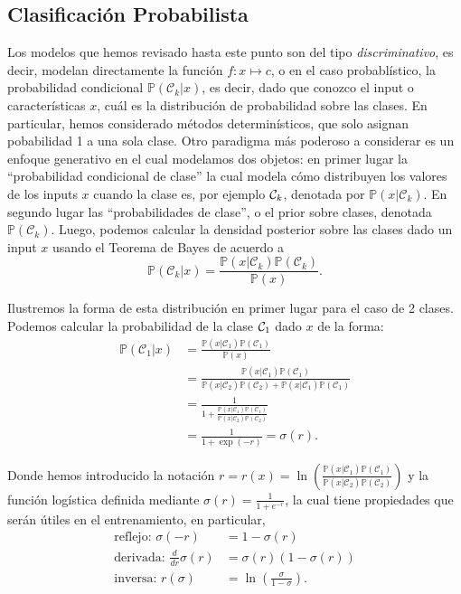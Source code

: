 \subsection{Clasificación Probabilista}

Los modelos que hemos revisado hasta este punto son del tipo \emph{discriminativo}, es decir, modelan directamente la función $f:x\mapsto c$, o  en el caso probablístico, la probabilidad condicional $\mathbb{P}(\mathcal{C}_k|x)$, es decir, dado que conozco el input o características $x$, cuál es la distribución de probabilidad sobre las clases. En particular, hemos considerado métodos determinísticos, que  solo asignan pobabilidad 1 a una sola clase. Otro paradigma más poderoso a considerar es un enfoque generativo en el cual modelamos dos  objetos: en primer lugar la ``probabilidad condicional de clase'' la cual modela cómo distribuyen los valores de los inputs $x$ cuando la  clase es, por  ejemplo ${\mathcal C}_k$, denotada por $\mathbb{P}(x|\mathcal{C}_k)$. En segundo lugar las ``probabilidades de clase'', o el prior sobre clases, denotada $\mathbb{P}(\mathcal{C}_k)$. Luego, podemos calcular la densidad posterior sobre las clases dado un input $x$ usando el Teorema de Bayes de acuerdo a 
\begin{equation}
	\mathbb{P}(\mathcal{C}_k|x) = \frac{\mathbb{P}(x|\mathcal{C}_k)\mathbb{P}(\mathcal{C}_k)}{\mathbb{P}(x)}.
\end{equation}

Ilustremos la forma de esta distribución en primer lugar para el caso de 2 clases. Podemos calcular la probabilidad de la clase ${\mathcal C}_1$ dado $x$ de la forma:
\begin{align}
	\mathbb{P}(\mathcal{C}_1|x) &= \frac{\mathbb{P}(x|\mathcal{C}_1)\mathbb{P}(\mathcal{C}_1)}{\mathbb{P}(x)}\nonumber\\
	&= \frac{\mathbb{P}(x|\mathcal{C}_1)\mathbb{P}(\mathcal{C}_1)}{\mathbb{P}(x|\mathcal{C}_2)\mathbb{P}(\mathcal{C}_2)+\mathbb{P}(x|\mathcal{C}_1)\mathbb{P}(\mathcal{C}_1)}\nonumber\\
	&=\frac{1}{1+\frac{\mathbb{P}(x|\mathcal{C}_1)\mathbb{P}(\mathcal{C}_1)}{\mathbb{P}(x|\mathcal{C}_2)\mathbb{P}(\mathcal{C}_2)}}\nonumber\\
	&=\frac{1}{1+\exp(-r)} = \sigma(r).\label{eq:logistic1}
\end{align}

Donde hemos introducido la notación $r = r(x) =\ln\left(\frac{\mathbb{P}(x|\mathcal{C}_1)\mathbb{P}(\mathcal{C}_1)}{\mathbb{P}(x|\mathcal{C}_2)\mathbb{P}(\mathcal{C}_2)}\right)$  y la  función logística definida mediante $\sigma(r) = \frac{1}{1+e^{-r}}$, la cual  tiene propiedades que serán útiles en el entrenamiento, en particular, 
\begin{align}
	\text{reflejo: }\sigma(-r)&=1-\sigma(r)\\
	\text{derivada: }\frac{d}{dr}\sigma(r)&=\sigma(r)(1-\sigma(r))\\
	\text{inversa: }r(\sigma)&=\ln\left(\frac{\sigma}{1-\sigma}\right).
\end{align}


